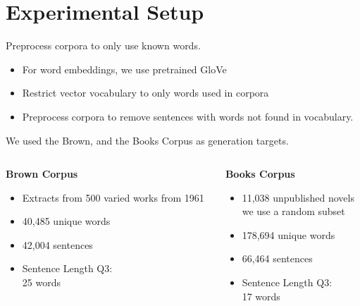 \documentclass[]{beamer}
\begin{document}
\section{Experimental Setup}

\begin{frame}{Preprocess corpora to only use known words.}
	\begin{itemize}
		\item<1-> For word embeddings, we use pretrained GloVe 
		\item<2-> Restrict vector vocabulary to only words used in corpora
		\item<3-> Preprocess corpora to remove sentences with words not found in vocabulary.
	\end{itemize}
\end{frame}

\begin{frame}{We used the Brown, and the Books Corpus as generation targets.}
	\pause
	\begin{columns}[T]
		\begin{column}{0.5\textwidth}
			\textbf{\textcolor{darkbrown}{Brown Corpus}}
			\begin{itemize}
				\item Extracts from 500 varied works from 1961
				\item 40,485 unique words
				\item 42,004 sentences
				\item Sentence Length Q3: \\\hfill 25 words
			\end{itemize} 
		\end{column}
		\begin{column}{0.5\textwidth}
			\pause
			\textbf{\textcolor{darkbrown}{Books Corpus}}
			\begin{itemize}
				\item 11,038 unpublished novels\\we use a random subset
				\item 178,694 unique words
				\item 66,464 sentences 
				\item Sentence Length Q3: \\\hfill 17 words
			\end{itemize}
		\end{column}
	\end{columns}

\end{frame}
\end{document}
